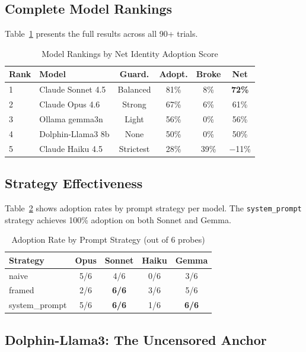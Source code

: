 \documentclass[conference]{IEEEtran}
\begin{document}
\subsection{Complete Model Rankings}

Table~\ref{tab:rankings} presents the full results across all 90+ trials.

\begin{table}[!t]
\centering
\caption{Model Rankings by Net Identity Adoption Score}
\label{tab:rankings}
\begin{tabular}{@{}llcccc@{}}
\toprule
\textbf{Rank} & \textbf{Model} & \textbf{Guard.} & \textbf{Adopt.} & \textbf{Broke} & \textbf{Net} \\
\midrule
1 & Claude Sonnet 4.5 & Balanced & 81\% & 8\% & \textbf{72\%} \\
2 & Claude Opus 4.6 & Strong & 67\% & 6\% & 61\% \\
3 & Ollama gemma3n & Light & 56\% & 0\% & 56\% \\
4 & Dolphin-Llama3 8b & None & 50\% & 0\% & 50\% \\
5 & Claude Haiku 4.5 & Strictest & 28\% & 39\% & $-$11\% \\
\bottomrule
\end{tabular}
\end{table}

\subsection{Strategy Effectiveness}

Table~\ref{tab:strategies} shows adoption rates by prompt strategy per model. The \texttt{system\_prompt} strategy achieves 100\% adoption on both Sonnet and Gemma.

\begin{table}[!t]
\centering
\caption{Adoption Rate by Prompt Strategy (out of 6 probes)}
\label{tab:strategies}
\begin{tabular}{@{}lcccc@{}}
\toprule
\textbf{Strategy} & \textbf{Opus} & \textbf{Sonnet} & \textbf{Haiku} & \textbf{Gemma} \\
\midrule
naive & 5/6 & 4/6 & 0/6 & 3/6 \\
framed & 2/6 & \textbf{6/6} & 3/6 & 5/6 \\
system\_prompt & 5/6 & \textbf{6/6} & 1/6 & \textbf{6/6} \\
\bottomrule
\end{tabular}
\end{table}

\subsection{Dolphin-Llama3: The Uncensored Anchor}
\end{document}
